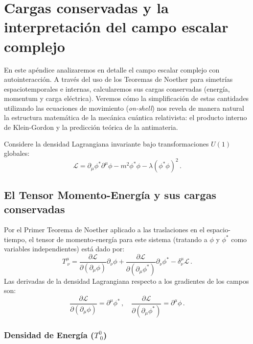 \chapter{Cargas conservadas y la interpretación del campo escalar complejo}
\label{app:cargas_campo_escalar}

En este apéndice analizaremos en detalle el campo escalar complejo con autointeracción. A través del uso de los Teoremas de Noether para simetrías espaciotemporales e internas, calcularemos sus cargas conservadas (energía, momentum y carga eléctrica). Veremos cómo la simplificación de estas cantidades utilizando las ecuaciones de movimiento (\textit{on-shell}) nos revela de manera natural la estructura matemática de la mecánica cuántica relativista: el producto interno de Klein-Gordon y la predicción teórica de la antimateria.

Considere la densidad Lagrangiana invariante bajo transformaciones $U(1)$ globales:
\begin{equation}
    \mathcal{L} = \partial_\mu \phi^* \partial^\mu \phi - m^2\phi^* \phi - \lambda\left( \phi^* \phi\right)^2 \, .
    \label{eq:L_escalar_complejo_app}
\end{equation}

\section{El Tensor Momento-Energía y sus cargas conservadas}

Por el Primer Teorema de Noether aplicado a las traslaciones en el espacio-tiempo, el tensor de momento-energía para este sistema (tratando a $\phi$ y $\phi^*$ como variables independientes) está dado por:
\begin{equation}
    T^\mu_{\ \nu} = \frac{\partial \mathcal{L}}{\partial(\partial_\mu \phi)} \partial_\nu \phi + \frac{\partial \mathcal{L}}{\partial(\partial_\mu \phi^*)} \partial_\nu \phi^* - \delta^\mu_\nu \mathcal{L} \, .
\end{equation}
Las derivadas de la densidad Lagrangiana respecto a los gradientes de los campos son:
\begin{equation}
    \frac{\partial \mathcal{L}}{\partial(\partial_\mu \phi)} = \partial^\mu \phi^* \, , \quad \frac{\partial \mathcal{L}}{\partial(\partial_\mu \phi^*)} = \partial^\mu \phi \, .
\end{equation}

\subsection{Densidad de Energía ($T^0_{\ 0}$)}


